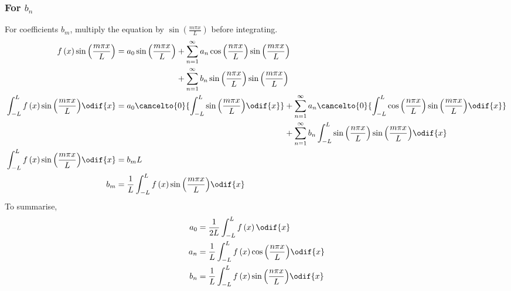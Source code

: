 \documentclass{article}
\begin{document}
\subsubsection{For \texorpdfstring{\(b_n\)}{bn}}
For coefficients \(b_m\), multiply the equation by \(\sin{\left( \frac{m \pi x}{L} \right)}\) before integrating.
\begin{align*}
    f\left( x \right) \sin{\left( \frac{m \pi x}{L} \right)}                      & =
    \begin{aligned}[t]
        a_0 \sin{\left( \frac{m \pi x}{L} \right)} & + \sum_{n = 1}^\infty a_n \cos{\left( \frac{n \pi x}{L} \right)} \sin{\left( \frac{m \pi x}{L} \right)} \\
                                                   & + \sum_{n = 1}^\infty b_n \sin{\left( \frac{n \pi x}{L} \right)} \sin{\left( \frac{m \pi x}{L} \right)}
    \end{aligned}
    \\
    \int_{-L}^L f\left( x \right) \sin{\left( \frac{m \pi x}{L} \right)} \odif{x} & =
    \begin{aligned}[t]
        a_0 \cancelto{0}{\int_{-L}^L \sin{\left( \frac{m \pi x}{L} \right)} \odif{x}} & + \sum_{n = 1}^\infty a_n \cancelto{0}{\int_{-L}^L \cos{\left( \frac{n \pi x}{L} \right)} \sin{\left( \frac{m \pi x}{L} \right)} \odif{x}} \\
                                                                                      & + \sum_{n = 1}^\infty b_n \int_{-L}^L \sin{\left( \frac{n \pi x}{L} \right)} \sin{\left( \frac{m \pi x}{L} \right)} \odif{x}
    \end{aligned}
    \\
    \int_{-L}^L f\left( x \right) \sin{\left( \frac{m \pi x}{L} \right)} \odif{x} & = b_m L                                                                                     \\
    b_m                                                                           & = \frac{1}{L} \int_{-L}^L f\left( x \right) \sin{\left( \frac{m \pi x}{L} \right)} \odif{x}
\end{align*}
To summarise,
\begin{align*}
    a_0 & = \frac{1}{2L} \int_{-L}^L f\left( x \right) \odif{x}                                       \\
    a_n & = \frac{1}{L} \int_{-L}^L f\left( x \right) \cos{\left( \frac{n \pi x}{L} \right)} \odif{x} \\
    b_n & = \frac{1}{L} \int_{-L}^L f\left( x \right) \sin{\left( \frac{n \pi x}{L} \right)} \odif{x}
\end{align*}
\end{document}
